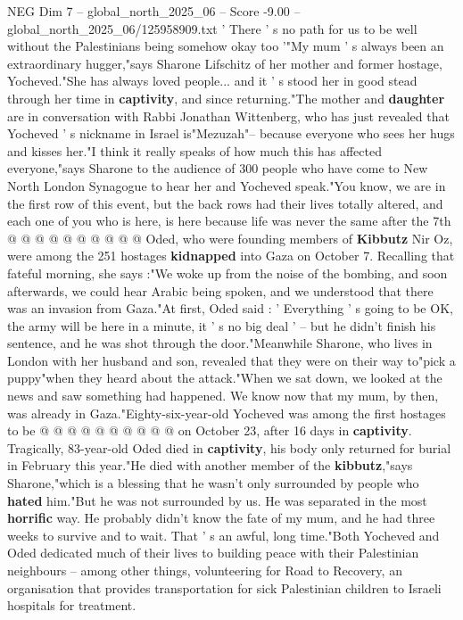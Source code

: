 \begin{textsample}{NEG Dim 7 – global\_north\_2025\_06 – Score -9.00 – global\_north\_2025\_06/125958909.txt}  \label{ex:f7_neg_074}
' There ' s no path for us to be well without the Palestinians being somehow okay too '"My mum ' s always been an extraordinary hugger,"says Sharone Lifschitz of her mother and former hostage, Yocheved."She has always loved people... and it ' s stood her in good stead through her time in \textbf{captivity}, and since returning."The mother and \textbf{daughter} are in conversation with Rabbi Jonathan Wittenberg, who has just revealed that Yocheved ' s nickname in Israel is"Mezuzah"-- because everyone who sees her hugs and kisses her."I think it really speaks of how much this has affected everyone,"says Sharone to the audience of 300 people who have come to New North London Synagogue to hear her and Yocheved speak."You know, we are in the first row of this event, but the back rows had their lives totally altered, and each one of you who is here, is here because life was never the same after the 7th @ @ @ @ @ @ @ @ @ @ Oded, who were founding members of \textbf{Kibbutz} Nir Oz, were among the 251 hostages \textbf{kidnapped} into Gaza on October 7.
Recalling that fateful morning, she says :"We woke up from the noise of the bombing, and soon afterwards, we could hear Arabic being spoken, and we understood that there was an invasion from Gaza."At first, Oded said : ' Everything ' s going to be OK, the army will be here in a minute, it ' s no big deal ' -- but he didn't finish his sentence, and he was shot through the door."Meanwhile Sharone, who lives in London with her husband and son, revealed that they were on their way to"pick a puppy"when they heard about the attack."When we sat down, we looked at the news and saw something had happened.
We know now that my mum, by then, was already in Gaza."Eighty-six-year-old Yocheved was among the first hostages to be @ @ @ @ @ @ @ @ @ @ on October 23, after 16 days in \textbf{captivity}.
Tragically, 83-year-old Oded died in \textbf{captivity}, his body only returned for burial in February this year."He died with another member of the \textbf{kibbutz},"says Sharone,"which is a blessing that he wasn't only surrounded by people who \textbf{hated} him."But he was not surrounded by us.
He was separated in the most \textbf{horrific} way.
He probably didn't know the fate of my mum, and he had three weeks to survive and to wait.
That ' s an awful, long time."Both Yocheved and Oded dedicated much of their lives to building peace with their Palestinian neighbours -- among other things, volunteering for Road to Recovery, an organisation that provides transportation for sick Palestinian children to Israeli hospitals for treatment.

\end{textsample}
